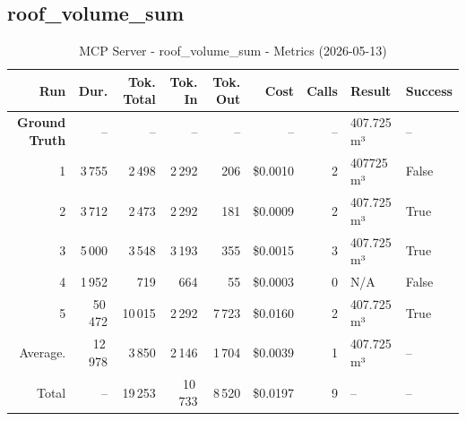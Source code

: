 \documentclass[a4paper,11pt]{article}
\begin{document}
\clearpage
\subsection{roof\_volume\_sum}

\begin{table}[ht]
\centering
\scriptsize
\caption{MCP Server - roof\_volume\_sum - Metrics (2026-05-13)}
\label{tab:mcp\_roof\_volume\_sum\_metrics\_2026-05-13}
\begin{tabular}{r r r r r r r p{3cm} l}
\hline
Run & Dur. & Tok. Total & Tok. In & Tok. Out & Cost & Calls & Result & Success \\
\hline
\textbf{Ground Truth} & -- & -- & -- & -- & -- & -- & 407.725 m³ & -- \\
\hline
1 & 3\,755 & 2\,498 & 2\,292 & 206 & \$0.0010 & 2 & 407725 m³ & False \\
2 & 3\,712 & 2\,473 & 2\,292 & 181 & \$0.0009 & 2 & 407.725 m³ & True \\
3 & 5\,000 & 3\,548 & 3\,193 & 355 & \$0.0015 & 3 & 407.725 m³ & True \\
4 & 1\,952 & 719 & 664 & 55 & \$0.0003 & 0 & N/A & False \\
5 & 50\,472 & 10\,015 & 2\,292 & 7\,723 & \$0.0160 & 2 & 407.725 m³ & True \\
\hline
Average. & 12\,978 & 3\,850 & 2\,146 & 1\,704 & \$0.0039 & 1 & 407.725 m³ & -- \\
Total & -- & 19\,253 & 10\,733 & 8\,520 & \$0.0197 & 9 & -- & -- \\
\hline
\end{tabular}
\end{table}

\clearpage
\end{document}
